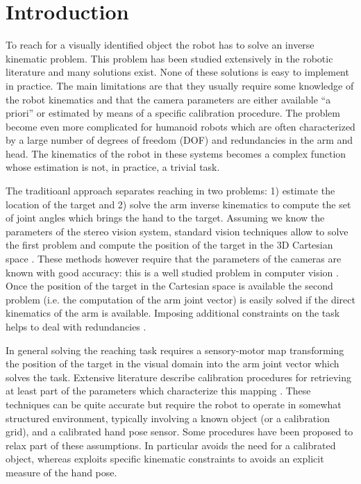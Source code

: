 \section{Introduction}
To reach for a visually identified object the robot has to solve
an inverse kinematic problem. This problem has been studied 
extensively in the robotic literature 
and many solutions exist. None of these solutions is easy to 
implement in practice. The main limitations are that they usually require 
some knowledge of the robot kinematics and that the camera parameters 
are either available ``a priori'' or estimated by means of a specific
calibration procedure. The problem become even more complicated 
for humanoid robots which are often characterized by 
a large number of degrees of freedom (DOF) and redundancies in the 
arm and head. The kinematics of the robot in these systems becomes a 
complex function whose estimation is not, in practice, a trivial task.

The traditioanl approach separates reaching in two
problems: 1) estimate the location of the target and
2) solve the arm inverse kinematics to compute the set of joint
angles which brings the hand to the target. Assuming we know the 
parameters of the stereo vision system, standard vision techniques
allow to solve the first problem and compute the position of the 
target in the 3D Cartesian space \cite{Soatto03vision}. These methods 
however require that the parameters of the cameras are known with 
good accuracy: this is a well studied problem in computer 
vision \cite{Soatto03vision}. Once the 
position of the target in the Cartesian space is available 
the second problem (i.e. the computation of the arm joint vector) is 
easily solved if the direct kinematics of the arm is available. 
Imposing additional constraints on the task helps to deal with 
redundancies \cite{liegeois77automatic}.

In general solving the reaching task requires a sensory-motor map
transforming the position of the target in the visual domain into the 
arm joint vector which solves the task. Extensive literature describe 
calibration procedures for retrieving at least part of the parameters 
which characterize this mapping 
\cite{Hollerbach96calibration,Tsai88Calibration}. 
These techniques can be quite accurate but require the robot to operate
in somewhat structured environment, typically involving a known object (or
a calibration grid), and a calibrated hand pose sensor. Some procedures 
have been proposed to relax part of these assumptions. In particular 
\cite{AHE01} avoids the need for a calibrated object, whereas 
\cite{Bennett91calibration} exploits specific kinematic constraints 
to avoids an explicit measure of the hand pose.

